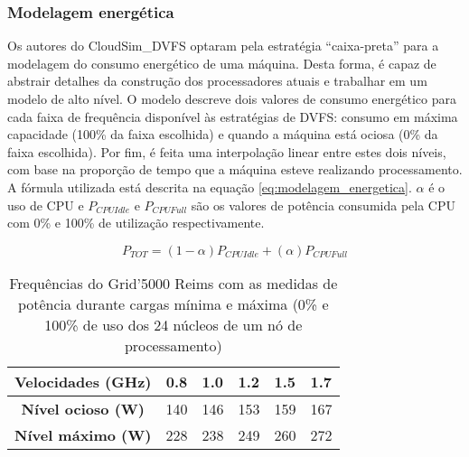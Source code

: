 \subsubsection{Modelagem energética} %
\label{ssub:modelagem_energ_tica}

Os autores do CloudSim\_DVFS optaram pela estratégia ``caixa-preta'' para a
modelagem do consumo energético de uma máquina. Desta forma, é capaz de abstrair
detalhes da construção dos processadores atuais e trabalhar em um modelo de
alto nível. O modelo descreve dois valores de consumo energético para cada
faixa de frequência disponível às estratégias de DVFS: consumo em máxima
capacidade (100\% da faixa escolhida) e quando a máquina está ociosa (0\% 
da faixa escolhida). Por fim, é feita uma interpolação linear entre estes
dois níveis, com base na proporção de tempo que a máquina esteve realizando
processamento. A fórmula utilizada está descrita na equação \ref{eq:modelagem_energetica}. $\alpha$ é o uso de CPU e $P_{CPUIdle}$ e $P_{CPUFull}$ são os valores
de potência consumida pela CPU com 0\% e 100\% de utilização respectivamente.

\begin{equation}
P_{TOT} = (1 - \alpha)P_{CPUIdle} + (\alpha)P_{CPUFull} \label{eq:modelagem_energetica}  
\end{equation}

\begin{table}
    \centering
    \begin{tabular}{c|cllll}
    \hline
    \textbf{Velocidades (GHz)} & \textbf{0.8} & \textbf{1.0} & \textbf{1.2} & \textbf{1.5} & \textbf{1.7} \\ \hline
    \textbf{Nível ocioso (W)}       & 140          & 146          & 153          & 159          & 167          \\
    \textbf{Nível máximo (W)}  & 228          & 238          & 249          & 260          & 272          \\ \hline
    \end{tabular}
    \caption{Frequências do Grid'5000 Reims com as medidas de potência durante
    cargas mínima e máxima (0\% e 100\% de uso dos 24 núcleos de um nó de processamento)
    \cite{guerout:energy_aware_simulation}}
\end{table}


